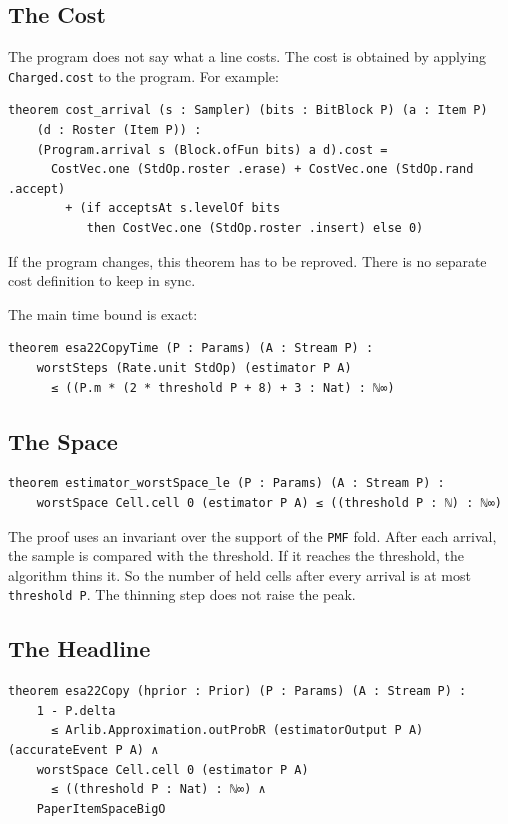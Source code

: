 \documentclass[acmsmall,nonacm]{acmart}
\begin{document}
\subsection{The Cost}\label{sec:cost}

The program does not say what a line costs.
The cost is obtained by applying \lstinline{Charged.cost} to the program.
For example:

\begin{lstlisting}
theorem cost_arrival (s : Sampler) (bits : BitBlock P) (a : Item P)
    (d : Roster (Item P)) :
    (Program.arrival s (Block.ofFun bits) a d).cost =
      CostVec.one (StdOp.roster .erase) + CostVec.one (StdOp.rand .accept)
        + (if acceptsAt s.levelOf bits
           then CostVec.one (StdOp.roster .insert) else 0)
\end{lstlisting}

If the program changes, this theorem has to be reproved.
There is no separate cost definition to keep in sync.

The main time bound is exact:

\begin{lstlisting}
theorem esa22CopyTime (P : Params) (A : Stream P) :
    worstSteps (Rate.unit StdOp) (estimator P A)
      ≤ ((P.m * (2 * threshold P + 8) + 3 : Nat) : ℕ∞)
\end{lstlisting}

\subsection{The Space}\label{sec:space}

\begin{lstlisting}
theorem estimator_worstSpace_le (P : Params) (A : Stream P) :
    worstSpace Cell.cell 0 (estimator P A) ≤ ((threshold P : ℕ) : ℕ∞)
\end{lstlisting}

The proof uses an invariant over the support of the \lstinline{PMF} fold.
After each arrival, the sample is compared with the threshold.
If it reaches the threshold, the algorithm thins it.
So the number of held cells after every arrival is at most \lstinline{threshold P}.
The thinning step does not raise the peak.

\subsection{The Headline}\label{sec:headline}

\begin{lstlisting}
theorem esa22Copy (hprior : Prior) (P : Params) (A : Stream P) :
    1 - P.delta
      ≤ Arlib.Approximation.outProbR (estimatorOutput P A) (accurateEvent P A) ∧
    worstSpace Cell.cell 0 (estimator P A)
      ≤ ((threshold P : Nat) : ℕ∞) ∧
    PaperItemSpaceBigO
\end{lstlisting}
\end{document}
